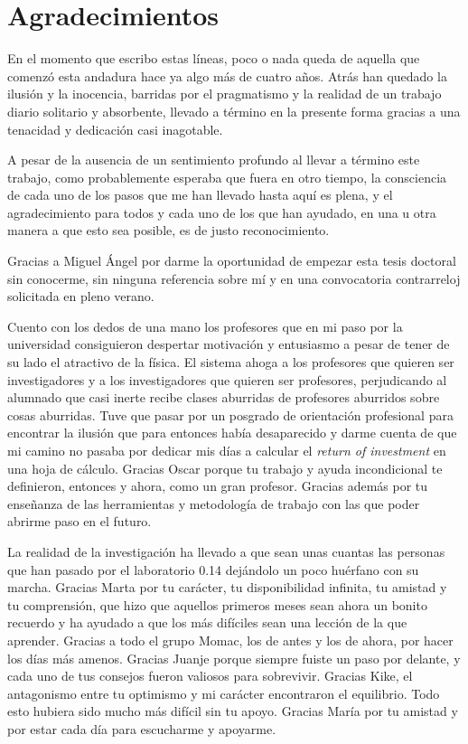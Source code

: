 \chapter*{Agradecimientos\label{cha:agradecimiento}}

En el momento que escribo estas líneas, poco o nada queda de aquella que comenzó esta andadura hace ya algo más de cuatro años. Atrás han quedado la ilusión y la inocencia, barridas por el pragmatismo y la realidad de un trabajo diario solitario y absorbente, llevado a término en la presente forma gracias a una tenacidad y dedicación casi inagotable.

A pesar de la ausencia de un sentimiento profundo al llevar a término este trabajo, como probablemente esperaba que fuera en otro tiempo, la consciencia de cada uno de los pasos que me han llevado hasta aquí es plena, y el agradecimiento para todos y cada uno de los que han ayudado, en una u otra manera a que esto sea posible, es de justo reconocimiento.

Gracias a Miguel Ángel por darme la oportunidad de empezar esta tesis doctoral sin conocerme, sin ninguna referencia sobre mí y en una convocatoria contrarreloj solicitada en pleno verano.

Cuento con los dedos de una mano los profesores que en mi paso por la universidad consiguieron despertar motivación y entusiasmo a pesar de tener de su lado el atractivo de la física. El sistema ahoga a los profesores que quieren ser investigadores y a los investigadores que quieren ser profesores, perjudicando al alumnado que casi inerte recibe clases aburridas de profesores aburridos sobre cosas aburridas. Tuve que pasar por un posgrado de orientación profesional para encontrar la ilusión que para entonces había desaparecido y darme cuenta de que mi camino no pasaba por dedicar mis días a calcular el \textit{return of investment} en una hoja de cálculo. Gracias Oscar porque tu trabajo y ayuda incondicional te definieron, entonces y ahora, como un gran profesor. Gracias además por tu enseñanza de las herramientas y metodología de trabajo con las que poder abrirme paso en el futuro.

La realidad de la investigación ha llevado a que sean unas cuantas las personas que han pasado por el laboratorio 0.14 dejándolo un poco huérfano con su marcha. Gracias Marta por tu carácter, tu disponibilidad infinita, tu amistad y tu comprensión, que hizo que aquellos primeros meses sean ahora un bonito recuerdo y ha ayudado a que los más difíciles sean una lección de la que aprender. Gracias a todo el grupo Momac, los de antes y los de ahora, por hacer los días más amenos. Gracias Juanje porque siempre fuiste un paso por delante, y cada uno de tus consejos fueron valiosos para sobrevivir. Gracias Kike, el antagonismo entre tu optimismo y mi carácter encontraron el equilibrio. Todo esto hubiera sido mucho más difícil sin tu apoyo. Gracias María por tu amistad y por estar cada día para escucharme y apoyarme. 


